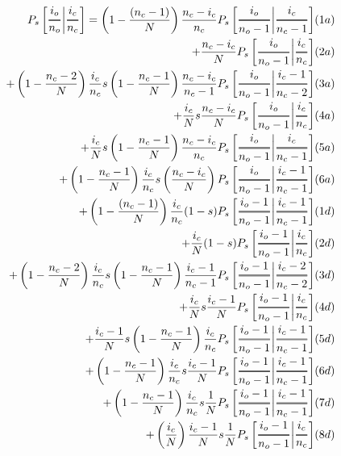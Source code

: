 \documentclass[preview]{standalone}
\newcommand{\Dfrac}[2]{%
  \ooalign{%
    $\genfrac{}{}{1.2pt}0{#1}{#2}$\cr%
    $\color{white}\genfrac{}{}{.4pt}0{\phantom{#1}}{\phantom{#2}}$}%
}
\newcommand{\cond}{\middle\vert}
\begin{document}
\begin{equation*}
  \begin{aligned}
    P_s\left[ \Dfrac{i_o}{n_o} \cond \Dfrac{i_c}{n_c} \right]
    = \left(1-\frac{(n_c-1)}{N}\right)\frac{n_c-i_c}{n_c} P_s\left[ \Dfrac{i_o}{n_o-1} \cond
      \Dfrac{i_c}{n_c-1} \right]& (1a)\\ %
      + \frac{n_c-i_c}{N} P_s\left[ \Dfrac{i_o}{n_o-1} \cond \Dfrac{i_c}{n_c} \right]& (2a)\\ %
    + \left(1-\frac{n_c-2}{N}\right) \frac{i_c}{n_c} s  \left(1-\frac{n_c-1}{N}\right)
      \frac{n_c-i_c}{n_c-1} P_s\left[ \Dfrac{i_o}{n_o-1} \cond \Dfrac{i_c-1}{n_c-2} \right]& (3a) \\ %
    + \frac{i_c}{N} s  \frac{n_c-i_c}{N}  P_s\left[ \Dfrac{i_o}{n_o-1} \cond \Dfrac{i_c}{n_c}
      \right]  &  (4a) \\ %
    + \frac{i_c}{N} s  \left(1-\frac{n_c-1}{N}\right) \frac{n_c-i_c}{n_c}  P_s\left[
        \Dfrac{i_o}{n_o-1} \cond \Dfrac{i_c}{n_c-1} \right]& (5a) \\ %
    + \left(1-\frac{n_c-1}{N}\right) \frac{i_c}{n_c} s  \left(\frac{ n_c-i_c }{N}\right) P_s\left[
        \Dfrac{i_o}{n_o-1} \cond \Dfrac{i_c-1}{n_c-1} \right]& (6a) \\ %
    + \left(1-\frac{(n_c-1)}{N}\right)\frac{i_c}{n_c} (1-s) P_s\left[ \Dfrac{i_o-1}{n_o-1} \cond
      \Dfrac{i_c-1}{n_c-1} \right]& (1d) \\ %
      + \frac{i_c}{N} (1-s) P_s\left[ \Dfrac{i_o-1}{n_o-1} \cond \Dfrac{i_c}{n_c} \right]& (2d) \\ %
    + \left(1-\frac{n_c-2}{N}\right) \frac{i_c}{n_c} s  \left(1-\frac{n_c-1}{N}\right)
      \frac{i_c-1}{n_c-1} P_s\left[ \Dfrac{i_o-1}{n_o-1} \cond \Dfrac{i_c-2}{n_c-2} \right]& (3d) \\ %
    + \frac{i_c}{N} s  \frac{i_c-1}{N}   P_s\left[ \Dfrac{i_o-1}{n_o-1} \cond \Dfrac{i_c}{n_c}
      \right]& (4d) \\ %
    + \frac{i_c-1}{N} s  \left(1-\frac{n_c-1}{N}\right) \frac{i_c}{n_c}   P_s\left[
        \Dfrac{i_o-1}{n_o-1} \cond \Dfrac{i_c-1}{n_c-1} \right]& (5d) \\ %
    + \left(1-\frac{n_c-1}{N}\right) \frac{i_c}{n_c} s \frac{i_c-1}{N} P_s\left[
        \Dfrac{i_o-1}{n_o-1} \cond \Dfrac{i_c-1}{n_c-1} \right]& (6d) \\ %
    + \left(1-\frac{n_c-1}{N}\right) \frac{i_c}{n_c} s \frac{1}{N} P_s\left[
        \Dfrac{i_o-1}{n_o-1} \cond \Dfrac{i_c-1}{n_c-1} \right]& (7d) \\ %
    + \left(\frac{i_c}{N}\right) \frac{i_c-1}{N} s \frac{1}{N} P_s\left[
        \Dfrac{i_o-1}{n_o-1} \cond \Dfrac{i_c}{n_c} \right]& (8d) \\ %
  \end{aligned}
\end{equation*}
\end{document}
